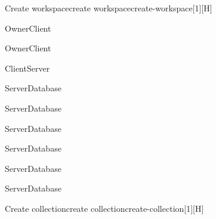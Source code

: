 \begin{toexclude}
\begin{sdfig}{Create workspace}{create workspace}{create-workspace}[1][H]
  \begin{seqdigauth}[Owner]
    \begin{umlcall}[op={Create workspace},return={Redirect to workspace creation}]{Owner}{Client}
    \end{umlcall}
    \begin{umlcall}[op={Submit name}]{Owner}{Client}
      \begin{umlcall}[op={Create workspace},return=Ok]{Client}{Server}
        \begin{umlcall}[op={Create project}]{Server}{Database}
          \begin{umlcall}[op={Create collection}]{Server}{Database}
            \begin{umlcall}[op={Create field}]{Server}{Database}
            \end{umlcall}
            \begin{umlcall}[op={Create view}]{Server}{Database}
            \end{umlcall}
            \begin{umlcall}[op={Create document}]{Server}{Database}
              \begin{umlcall}[op={Create block}]{Server}{Database}
              \end{umlcall}
            \end{umlcall}
          \end{umlcall}
        \end{umlcall}
      \end{umlcall}
    \end{umlcall}
  \end{seqdigauth}
\end{sdfig}

\begin{sdfig}{Create collection}{create collection}{create-collection}[1][H]


\end{sdfig}
\end{toexclude}
